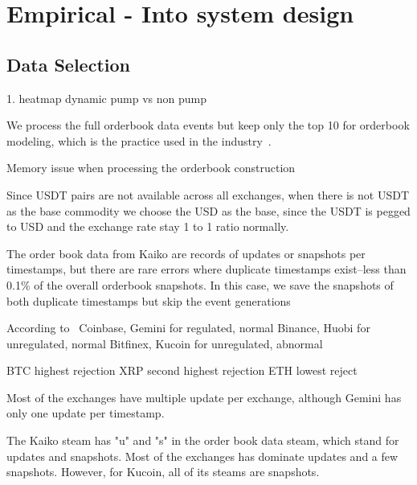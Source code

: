 \section{Empirical - Into system design}



\subsection{Data Selection}
1. heatmap dynamic pump vs non pump



We process the full orderbook data events but keep only the top 10 for orderbook modeling, which is the practice used in the industry~\cite{Shi2022StateSimulation}. 


Memory issue when processing the orderbook construction



Since USDT pairs are not available across all exchanges, when there is not USDT as the base commodity we choose the USD as the base, since the USDT is pegged to USD and the exchange rate stay 1 to 1 ratio normally. 

The order book data from Kaiko are records of updates or snapshots per timestamps, but there are rare errors where duplicate timestamps exist--less than 0.1\% of the overall orderbook snapshots. In this case, we save the snapshots of both duplicate timestamps but skip the event generations 



According to~\cite{Cong2023CryptoTrading}
Coinbase, Gemini for regulated, normal
Binance, Huobi for unregulated, normal
Bitfinex, Kucoin for unregulated, abnormal

BTC highest rejection
XRP second highest rejection
ETH lowest reject


Most of the exchanges have multiple update per exchange, although Gemini has only one update per timestamp. 

The Kaiko steam has "u" and "s" in the order book data steam, which stand for updates and snapshots. Most of the exchanges has dominate updates and a few snapshots. However, for Kucoin, all of its steams are snapshots.

